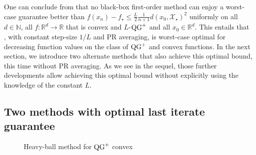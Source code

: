 One can conclude from  that no black-box first-order method can enjoy a worst-case guarantee better than $f(x_n) - f_\star \leq \frac{L}{2}\frac{1}{n+1} d(x_0, \mathcal{X}_\star)^2$ uniformly on all $d\in\mathbb{N}$, all $f:\mathbb{R}^d\rightarrow\mathbb{R}$ that is convex and $L$-$\operatorname{QG}^+$ and all $x_0\in\mathbb{R}^d$. This entails that , with constant step-size $1/L$ and PR averaging, is worst-case optimal for decreasing function values on the class of $\operatorname{QG}^+$ and convex functions.
In the next section, we introduce two alternate methods that also achieve this optimal bound, this time without PR averaging. As we see in the sequel, those further developments allow achieving this optimal bound without explicitly using the knowledge of the constant $L$.
        
        \subsection{Two methods with optimal last iterate guarantee}\label{subsec:proposed_methods}

\begin{wrapfigure}[8]{R}{0.5\textwidth}
\begin{minipage}{0.5\textwidth}
\vspace{-0.9cm}
\SetInd{0.5em}{0.3em}
\begin{algorithm}[H]
    \caption{Heavy-ball method for $\operatorname{QG}^+$ convex}
    \label{alg:ogm}
\end{algorithm}
\end{minipage}
\end{wrapfigure}



